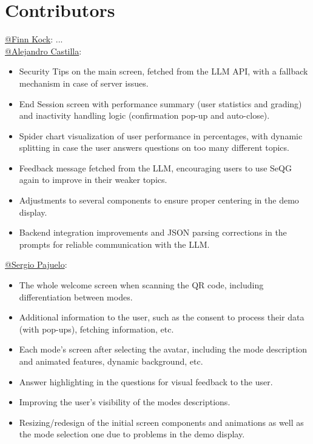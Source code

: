 \section{Contributors}

\href{https://github.com/finnkock}{@Finn Kock}: ... \\
\href{https://github.com/alecasbar}{@Alejandro Castilla}: 
\begin{itemize}
    \item Security Tips on the main screen, fetched from the LLM API, with a fallback mechanism in case of server issues.
    \item End Session screen with performance summary (user statistics and grading) and inactivity handling logic (confirmation pop-up and auto-close).
    \item Spider chart visualization of user performance in percentages, with dynamic splitting in case the user answers questions on too many different topics.
    \item Feedback message fetched from the LLM, encouraging users to use SeQG again to improve in their weaker topics.
    \item Adjustments to several components to ensure proper centering in the demo display.
    \item Backend integration improvements and JSON parsing corrections in the prompts for reliable communication with the LLM.
\end{itemize}

\href{https://github.com/sergioPajuelo}{@Sergio Pajuelo}:
\begin{itemize}
    \item The whole welcome screen when scanning the QR code, including differentiation between modes.
    \item Additional information to the user, such as the consent to process their data (with pop-ups), fetching information, etc.
    \item Each mode's screen after selecting the avatar, including the mode description and animated features, dynamic background, etc.
    \item Answer highlighting in the questions for visual feedback to the user.
    \item Improving the user's visibility of the modes descriptions.
    \item Resizing/redesign of the initial screen components and animations as well as the mode selection one due to problems in the demo display.
\end{itemize}


